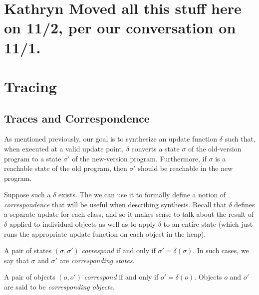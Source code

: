 \section{Kathryn Moved all this stuff here on 11/2, per our conversation on 11/1.}

\section{Tracing}

\subsection{Traces and Correspondence}

As mentioned previously, our goal is to synthesize an update function
$\delta$ such that, when executed at a valid update point, $\delta$
converts a state $\sigma$ of the old-version program to a state
$\sigma'$ of the new-version program.  Furthermore, if $\sigma$ is a
reachable state of the old program, then $\sigma'$ should be reachable
in the new program.

Suppose such a $\delta$ exists.  The we can use it to formally define
a notion of \emph{correspondence} that will be useful when describing
synthesis.  Recall that $\delta$ defines a separate update for each
class, and so it makes sense to talk about the result of $\delta$
applied to individual objects as well as to apply $\delta$ to an
entire state (which just runs the appropriate update function on each
object in the heap).


\begin{defn}
A pair of states $(\sigma,\sigma')$ \emph{correspond} if and only if
$\sigma' = \delta(\sigma)$.  In such cases, we say that $\sigma$ and
$\sigma'$ are \emph{corresponding states}.
\end{defn}

\begin{defn}
A pair of objects $(o, o')$ \emph{correspond} if and only if $o' =
\delta(o)$.  Objects $o$ and $o'$ are said to be \emph{corresponding
  objects}.
\end{defn}


